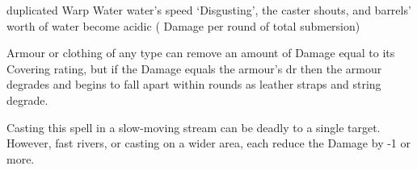   {duplicated}%
  {Warp}%
  {Water}%
  {water's speed}%
  {`Disgusting', the caster shouts, and  barrels' worth of water become acidic ( Damage per round of total submersion)}%
  {
    Armour or clothing of any type can remove an amount of Damage equal to its Covering rating, but if the Damage equals the armour's \gls{dr} then the armour degrades and begins to fall apart within  rounds as leather straps and string degrade.

    Casting this spell in a slow-moving stream can be deadly to a single target.
    However, fast rivers, or casting on a wider area, each reduce the Damage by -1 or more.
  }


